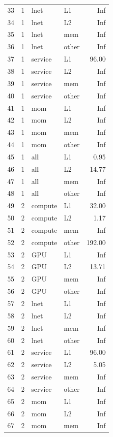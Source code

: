 \begin{table}[ht]
\begin{tabular}{rrllr}
  33 &   1 & lnet & L1 & Inf \\ 
  34 &   1 & lnet & L2 & Inf \\ 
  35 &   1 & lnet & mem & Inf \\ 
  36 &   1 & lnet & other & Inf \\ 
  37 &   1 & service & L1 & 96.00 \\ 
  38 &   1 & service & L2 & Inf \\ 
  39 &   1 & service & mem & Inf \\ 
  40 &   1 & service & other & Inf \\ 
  41 &   1 & mom & L1 & Inf \\ 
  42 &   1 & mom & L2 & Inf \\ 
  43 &   1 & mom & mem & Inf \\ 
  44 &   1 & mom & other & Inf \\ 
  45 &   1 & all & L1 & 0.95 \\ 
  46 &   1 & all & L2 & 14.77 \\ 
  47 &   1 & all & mem & Inf \\ 
  48 &   1 & all & other & Inf \\ 
  49 &   2 & compute & L1 & 32.00 \\ 
  50 &   2 & compute & L2 & 1.17 \\ 
  51 &   2 & compute & mem & Inf \\ 
  52 &   2 & compute & other & 192.00 \\ 
  53 &   2 & GPU & L1 & Inf \\ 
  54 &   2 & GPU & L2 & 13.71 \\ 
  55 &   2 & GPU & mem & Inf \\ 
  56 &   2 & GPU & other & Inf \\ 
  57 &   2 & lnet & L1 & Inf \\ 
  58 &   2 & lnet & L2 & Inf \\ 
  59 &   2 & lnet & mem & Inf \\ 
  60 &   2 & lnet & other & Inf \\ 
  61 &   2 & service & L1 & 96.00 \\ 
  62 &   2 & service & L2 & 5.05 \\ 
  63 &   2 & service & mem & Inf \\ 
  64 &   2 & service & other & Inf \\ 
  65 &   2 & mom & L1 & Inf \\ 
  66 &   2 & mom & L2 & Inf \\ 
  67 &   2 & mom & mem & Inf \\ 

\end{tabular}
\end{table}
